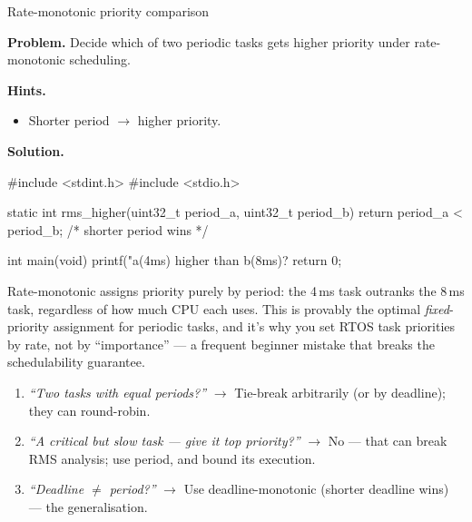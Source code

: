 \begin{gymproblem}{Rate-monotonic priority comparison}

\textbf{Problem.} Decide which of two periodic tasks gets higher priority under
rate-monotonic scheduling.

\textbf{Hints.}
\begin{itemize}
\item Shorter period $\rightarrow$ higher priority.
\end{itemize}

\attempt

\textbf{Solution.}
\begin{cgym}
#include <stdint.h>
#include <stdio.h>

static int rms_higher(uint32_t period_a, uint32_t period_b) {
    return period_a < period_b;     /* shorter period wins */
}

int main(void) {
    printf("a(4ms) higher than b(8ms)? %
    return 0;
}
\end{cgym}

Rate-monotonic assigns priority purely by period: the 4\,ms task outranks the
8\,ms task, regardless of how much CPU each uses. This is provably the optimal
\emph{fixed}-priority assignment for periodic tasks, and it's why you set RTOS
task priorities by rate, not by ``importance'' --- a frequent beginner mistake
that breaks the schedulability guarantee.

\followups
\begin{enumerate}
\item \emph{``Two tasks with equal periods?''} $\rightarrow$ Tie-break
  arbitrarily (or by deadline); they can round-robin.
\item \emph{``A critical but slow task --- give it top priority?''}
  $\rightarrow$ No --- that can break RMS analysis; use period, and bound its
  execution.
\item \emph{``Deadline $\ne$ period?''} $\rightarrow$ Use deadline-monotonic
  (shorter deadline wins) --- the generalisation.
\end{enumerate}
\end{gymproblem}

